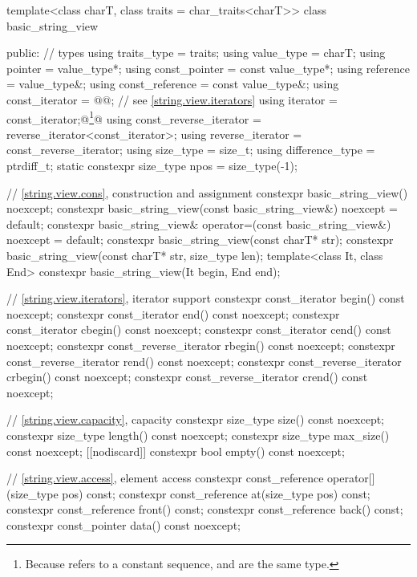 \begin{codeblock}
template<class charT, class traits = char_traits<charT>>
class basic_string_view {
public:
  // types
  using traits_type            = traits;
  using value_type             = charT;
  using pointer                = value_type*;
  using const_pointer          = const value_type*;
  using reference              = value_type&;
  using const_reference        = const value_type&;
  using const_iterator         = @@; // see \ref{string.view.iterators}
  using iterator               = const_iterator;@\footnote{Because  refers to a constant sequence,  and  are the same type.}@
  using const_reverse_iterator = reverse_iterator<const_iterator>;
  using reverse_iterator       = const_reverse_iterator;
  using size_type              = size_t;
  using difference_type        = ptrdiff_t;
  static constexpr size_type npos = size_type(-1);

  // \ref{string.view.cons}, construction and assignment
  constexpr basic_string_view() noexcept;
  constexpr basic_string_view(const basic_string_view&) noexcept = default;
  constexpr basic_string_view& operator=(const basic_string_view&) noexcept = default;
  constexpr basic_string_view(const charT* str);
  constexpr basic_string_view(const charT* str, size_type len);
  template<class It, class End>
    constexpr basic_string_view(It begin, End end);

  // \ref{string.view.iterators}, iterator support
  constexpr const_iterator begin() const noexcept;
  constexpr const_iterator end() const noexcept;
  constexpr const_iterator cbegin() const noexcept;
  constexpr const_iterator cend() const noexcept;
  constexpr const_reverse_iterator rbegin() const noexcept;
  constexpr const_reverse_iterator rend() const noexcept;
  constexpr const_reverse_iterator crbegin() const noexcept;
  constexpr const_reverse_iterator crend() const noexcept;

  // \ref{string.view.capacity}, capacity
  constexpr size_type size() const noexcept;
  constexpr size_type length() const noexcept;
  constexpr size_type max_size() const noexcept;
  [[nodiscard]] constexpr bool empty() const noexcept;

  // \ref{string.view.access}, element access
  constexpr const_reference operator[](size_type pos) const;
  constexpr const_reference at(size_type pos) const;
  constexpr const_reference front() const;
  constexpr const_reference back() const;
  constexpr const_pointer data() const noexcept;

}
\end{codeblock}
